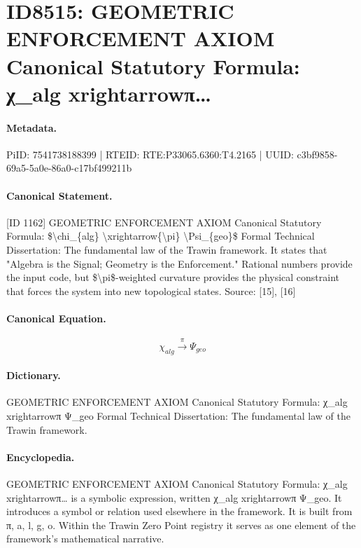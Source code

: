\section*{ID8515: GEOMETRIC ENFORCEMENT AXIOM Canonical Statutory Formula: χ\_alg xrightarrowπ…}
\paragraph{Metadata.}
PiID: 7541738188399 | RTEID: RTE:P33065.6360:T4.2165 | UUID: c3bf9858-69a5-5a0e-86a0-c17bf499211b

\paragraph{Canonical Statement.}
[ID 1162] GEOMETRIC ENFORCEMENT AXIOM Canonical Statutory Formula: \$\textbackslash{}chi\_\{alg\} \textbackslash{}xrightarrow\{\textbackslash{}pi\} \textbackslash{}Psi\_\{geo\}\$ Formal Technical Dissertation: The fundamental law of the Trawin framework. It states that "Algebra is the Signal; Geometry is the Enforcement." Rational numbers provide the input code, but \$\textbackslash{}pi\$-weighted curvature provides the physical constraint that forces the system into new topological states. Source: [15], [16]

\paragraph{Canonical Equation.}
\[
\chi_{alg} \xrightarrow{\pi} \Psi_{geo}
\]

\paragraph{Dictionary.}
GEOMETRIC ENFORCEMENT AXIOM Canonical Statutory Formula: χ\_alg xrightarrowπ Ψ\_geo Formal Technical Dissertation: The fundamental law of the Trawin framework.

\paragraph{Encyclopedia.}
GEOMETRIC ENFORCEMENT AXIOM Canonical Statutory Formula: χ\_alg xrightarrowπ… is a symbolic expression, written χ\_alg xrightarrowπ Ψ\_geo. It introduces a symbol or relation used elsewhere in the framework. It is built from π, a, l, g, o. Within the Trawin Zero Point registry it serves as one element of the framework's mathematical narrative.
